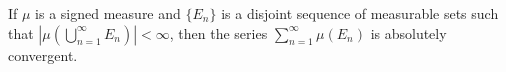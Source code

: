 If $\mu$ is a signed measure and $\{E_n\}$ is a disjoint sequence of measurable sets such that $|\mu(\bigcup_{n=1}^{\infty} E_n)| < \infty$, then the series $\sum_{n=1}^{\infty} \mu(E_n)$ is absolutely convergent.
